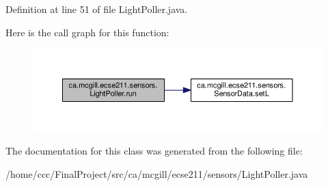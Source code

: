 Definition at line 51 of file Light\+Poller.\+java.

Here is the call graph for this function\+:
\nopagebreak
\begin{figure}[H]
\begin{center}
\leavevmode
\includegraphics[width=350pt]{classca_1_1mcgill_1_1ecse211_1_1sensors_1_1_light_poller_a31751b40132d9402de493aa9ec11d9d5_cgraph}
\end{center}
\end{figure}


The documentation for this class was generated from the following file\+:\begin{DoxyCompactItemize}
\item 
/home/ccc/\+Final\+Project/src/ca/mcgill/ecse211/sensors/Light\+Poller.\+java\end{DoxyCompactItemize}

